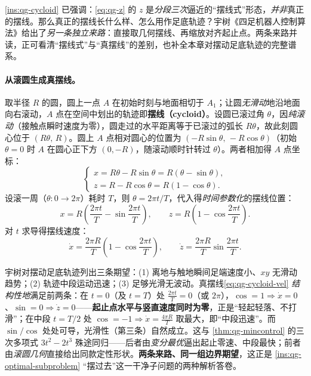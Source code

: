 \cref{ins:qg-cycloid} 已强调：\cref{eq:qg-z} 的 $z$ 是\emph{分段三次}逼近的“摆线式”形态，\emph{并非}真正的摆线。那么真正的摆线长什么样、怎么用作足底轨迹？宇树《四足机器人控制算法》给出了\emph{另一条独立来路}\cite{unitree2023quadruped}：直接取几何摆线、再缩放对齐起止点。两条来路并读，正可看清“摆线式”与“真摆线”的差别，也补全本章对摆动足底轨迹的完整谱系。

\paragraph{从滚圆生成真摆线。}
取半径 $R$ 的圆，圆上一点 $A$ 在初始时刻与地面相切于 $A_1$；让圆\emph{无滑动}地沿地面向右滚动，$A$ 点在空间中划出的轨迹即\textbf{摆线（cycloid）}。设圆已滚过角 $\theta$，因\emph{纯滚动}（接触点瞬时速度为零），圆走过的水平距离等于已滚过的弧长 $R\theta$，故此刻圆心位于 $(R\theta,\,R)$。圆上 $A$ 点相对圆心的位置为 $(-R\sin\theta,\,-R\cos\theta)$（初始 $\theta=0$ 时 $A$ 在圆心正下方 $(0,-R)$，随滚动顺时针转过 $\theta$）。两者相加得 $A$ 点坐标\cite{unitree2023quadruped}：
\begin{equation}
  \begin{cases}
  x=R\theta-R\sin\theta=R(\theta-\sin\theta),\\
  z=R-R\cos\theta=R(1-\cos\theta).
  \end{cases}
  \label{eq:qg-cycloid-geom}
\end{equation}
设滚一周（$\theta:0\to2\pi$）耗时 $T$，则 $\theta=2\pi t/T$，代入得\emph{时间参数化}的摆线位置\cite{unitree2023quadruped}：
\begin{equation}
  x=R\!\left(\frac{2\pi t}{T}-\sin\frac{2\pi t}{T}\right),
  \qquad
  z=R\!\left(1-\cos\frac{2\pi t}{T}\right).
  \label{eq:qg-cycloid-time}
\end{equation}
对 $t$ 求导得摆线速度\cite{unitree2023quadruped}：
\begin{equation}
  \dot x=\frac{2\pi R}{T}\!\left(1-\cos\frac{2\pi t}{T}\right),
  \qquad
  \dot z=\frac{2\pi R}{T}\sin\frac{2\pi t}{T}.
  \label{eq:qg-cycloid-vel}
\end{equation}

\begin{insight}\label{ins:qg-cycloid-why}
宇树对摆动足底轨迹列出三条期望\cite{unitree2023quadruped}：(1) 离地与触地瞬间足端速度小、$xy$ 无滑动趋势；(2) 轨迹中段运动迅速；(3) 足够光滑无波动。真摆线\cref{eq:qg-cycloid-vel} \emph{结构性地}满足前两条：在 $t=0$（及 $t=T$）处 $\tfrac{2\pi t}{T}=0$（或 $2\pi$），$\cos=1\Rightarrow\dot x=0$、$\sin=0\Rightarrow\dot z=0$——\textbf{起止点水平与竖直速度同时为零}，正是“轻起轻落、不打滑”；在中段 $t=T/2$ 处 $\cos=-1\Rightarrow\dot x=\tfrac{4\pi R}{T}$ 取最大，即“中段迅速”。而 $\sin/\cos$ 处处可导，光滑性（第三条）自然成立。这与 \cref{thm:qg-mincontrol} 的三次多项式 $3t^2-2t^3$ 殊途同归——后者由\emph{变分最优}逼出起止零速、中段最快；前者由\emph{滚圆几何}直接给出同款定性形状。\textbf{两条来路、同一组边界期望}，这正是 \cref{ins:qg-optimal-subproblem} “摆过去”这一干净子问题的两种解析答卷。
\end{insight}

